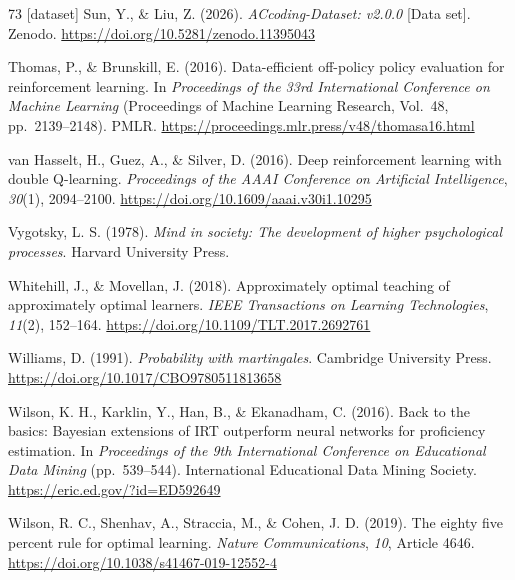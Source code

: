 \documentclass[a4paper,preprint,12pt,authoryear]{elsarticle}
\begin{document}
\begin{thebibliography}{73}
[dataset] Sun, Y., \& Liu, Z. (2026). \textit{ACcoding-Dataset: v2.0.0} [Data set]. Zenodo. \url{https://doi.org/10.5281/zenodo.11395043}

Thomas, P., \& Brunskill, E. (2016). Data-efficient off-policy policy evaluation for reinforcement learning. In \textit{Proceedings of the 33rd International Conference on Machine Learning} (Proceedings of Machine Learning Research, Vol.~48, pp.~2139--2148). PMLR. \url{https://proceedings.mlr.press/v48/thomasa16.html}

van Hasselt, H., Guez, A., \& Silver, D. (2016). Deep reinforcement learning with double Q-learning. \textit{Proceedings of the AAAI Conference on Artificial Intelligence}, \textit{30}(1), 2094--2100. \url{https://doi.org/10.1609/aaai.v30i1.10295}

Vygotsky, L. S. (1978). \textit{Mind in society: The development of higher psychological processes}. Harvard University Press.

Whitehill, J., \& Movellan, J. (2018). Approximately optimal teaching of approximately optimal learners. \textit{IEEE Transactions on Learning Technologies}, \textit{11}(2), 152--164. \url{https://doi.org/10.1109/TLT.2017.2692761}

Williams, D. (1991). \textit{Probability with martingales}. Cambridge University Press. \url{https://doi.org/10.1017/CBO9780511813658}

Wilson, K. H., Karklin, Y., Han, B., \& Ekanadham, C. (2016). Back to the basics: Bayesian extensions of IRT outperform neural networks for proficiency estimation. In \textit{Proceedings of the 9th International Conference on Educational Data Mining} (pp.~539--544). International Educational Data Mining Society. \url{https://eric.ed.gov/?id=ED592649}

Wilson, R. C., Shenhav, A., Straccia, M., \& Cohen, J. D. (2019). The eighty five percent rule for optimal learning. \textit{Nature Communications}, \textit{10}, Article 4646. \url{https://doi.org/10.1038/s41467-019-12552-4}


\end{thebibliography}
\end{document}
